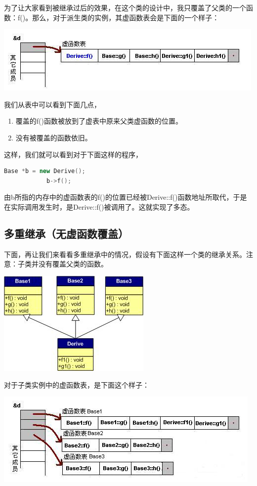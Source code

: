 \documentclass{article}
\begin{document}
\begin{CJK}{UTF8}{gbsn}
为了让大家看到被继承过后的效果，在这个类的设计中，我只覆盖了父类的一个函数：f()。那么，对于派生类的实例，其虚函数表会是下面的一个样子：

 \includegraphics{m4.JPG}
 
我们从表中可以看到下面几点，
\begin{enumerate}
\item 覆盖的f()函数被放到了虚表中原来父类虚函数的位置。
\item 没有被覆盖的函数依旧。
\end{enumerate}
这样，我们就可以看到对于下面这样的程序，
\begin{lstlisting}[language=c++]
            Base *b = new Derive();
            b->f();
\end{lstlisting}
由b所指的内存中的虚函数表的f()的位置已经被Derive::f()函数地址所取代，于是在实际调用发生时，是Derive::f()被调用了。这就实现了多态。

\subsection{多重继承（无虚函数覆盖）}

 下面，再让我们来看看多重继承中的情况，假设有下面这样一个类的继承关系。注意：子类并没有覆盖父类的函数。
 
\includegraphics{m5.jpg}

对于子类实例中的虚函数表，是下面这个样子：

\includegraphics{m6.JPG}


\end{CJK}
\end{document}
